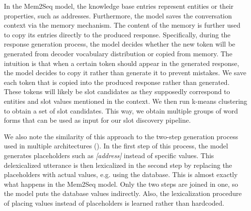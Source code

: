 In the Mem2Seq model, the knowledge base entries represent entities or their properties, such as addresses.
Furthermore, the model saves the conversation context via the memory mechanism.
The content of the memory is further used to copy its entries directly to the produced response.
Specifically, during the response generation process, the model decides whether the new token will be generated from decoder vocabulary distribution or copied from memory.
The intuition is that when a certain token should appear in the generated response, the model decides to copy it rather than generate it to prevent mistakes.
We save each token that is copied into the produced response rather than generated.
These tokens will likely be slot candidates as they supposedly correspond to entities and slot values mentioned in the context.
We then run k-means clustering to obtain a set of slot candidates.
This way, we obtain multiple groups of word forms that can be used as input for our slot discovery pipeline.

We also note the similarity of this approach to the two-step generation process used in multiple architectures (\cite{lei2018sequicity, peng2021soloist}).
In the first step of this process, the model generates placeholders such as \emph{[address]} instead of specific values.
This delexicalized utterance is then lexicalized in the second step by replacing the placeholders with actual values, e.g. using the database.
This is almost exactly what happens in the Mem2Seq model.
Only the two steps are joined in one, so the model puts the database values indirectly.
Also, the lexicalization procedure of placing values instead of placeholders is learned rather than hardcoded.

